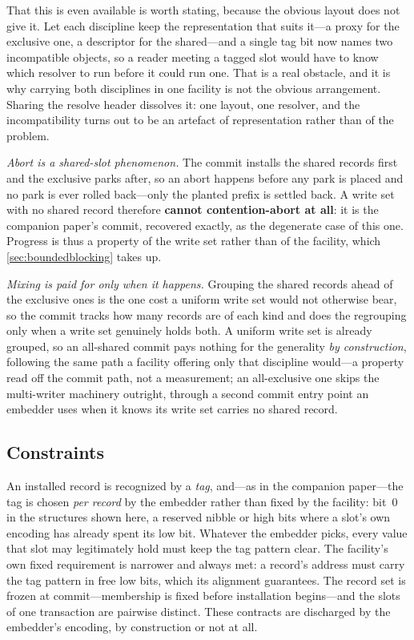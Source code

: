 \documentclass[11pt]{article}
\begin{document}
That this is even available is worth stating, because the obvious layout does not
give it. Let each discipline keep the representation that suits it---a proxy for
the exclusive one, a descriptor for the shared---and a single tag bit now names
two incompatible objects, so a reader meeting a tagged slot would have to know
which resolver to run before it could run one. That is a real obstacle, and it is
why carrying both disciplines in one facility is not the obvious arrangement.
Sharing the resolve header dissolves it: one layout, one resolver, and the
incompatibility turns out to be an artefact of representation rather than of the
problem.

\emph{Abort is a shared-slot phenomenon.} The commit installs the shared records
first and the exclusive parks after, so an abort happens before any park is
placed and no park is ever rolled back---only the planted prefix is settled back.
A write set with no shared record therefore \textbf{cannot contention-abort at
all}: it is the companion paper's \fliplatch commit, recovered exactly, as the
degenerate case of this one. Progress is thus a property of the write set rather
than of the facility, which \cref{sec:boundedblocking} takes up.

\emph{Mixing is paid for only when it happens.} Grouping the shared records ahead
of the exclusive ones is the one cost a uniform write set would not otherwise
bear, so the commit tracks how many records are of each kind and does the
regrouping only when a write set genuinely holds both. A uniform write set is
already grouped, so an all-shared commit pays nothing for the generality \emph{by
construction}, following the same path a facility offering only that discipline
would---a property read off the commit path, not a measurement; an
all-exclusive one skips the multi-writer machinery outright, through a second
commit entry point an embedder uses when it knows its write set carries no shared
record.

\subsection{Constraints}
\label{sec:constraints}

An installed record is recognized by a \emph{tag}, and---as in the companion
paper---the tag is chosen \emph{per record} by the embedder rather than fixed by
the facility: bit~0 in the structures shown here, a reserved nibble or high bits
where a slot's own encoding has already spent its low bit. Whatever the embedder
picks, every value that slot may legitimately hold must keep the tag pattern
clear. The facility's own fixed requirement is narrower and always met: a record's
address must carry the tag pattern in free low bits, which its alignment
guarantees.
The record set is frozen at commit---membership is fixed before installation
begins---and the slots of one transaction are pairwise distinct. These contracts
are discharged by the embedder's encoding, by construction or not at all.
\end{document}
